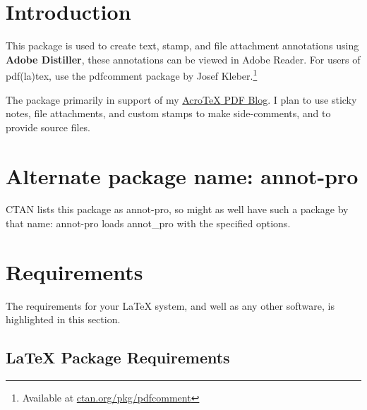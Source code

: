 \documentclass[12pt]{article}
\def\pkg{\textsf}
\begin{document}
\maketitle

\tableofcontents
{}


\section{Introduction}

This package is used to create text, stamp, and file attachment
annotations using \textbf{Adobe Distiller}, these annotations can be
viewed in Adobe Reader. For users of \textsf{pdf(la)tex}, use the
\textsf{pdfcomment} package by Josef Kleber.\footnote{Available at \href{http://ctan.org/pkg/pdfcomment}{ctan.org/pkg/pdfcomment}}

The package primarily in support of my \href{http://www.math.uakron.edu/~dpstory}
{{Acro\negthinspace\TeX} PDF Blog}. I plan to use sticky notes, file attachments, and
custom stamps to make side-comments, and to provide source files.

\section{Alternate package name: \texorpdfstring{\protect\pkg{annot-pro}}{annot-pro}}

CTAN lists this package as \pkg{annot-pro}, so might as well have such a package by that name:
\pkg{annot-pro} loads \pkg{annot\_pro} with the specified options.

\section{Requirements}

The requirements for your {\LaTeX} system, and well as any other
software, is highlighted in this section.

\subsection{{\LaTeX} Package Requirements}
\end{document}
